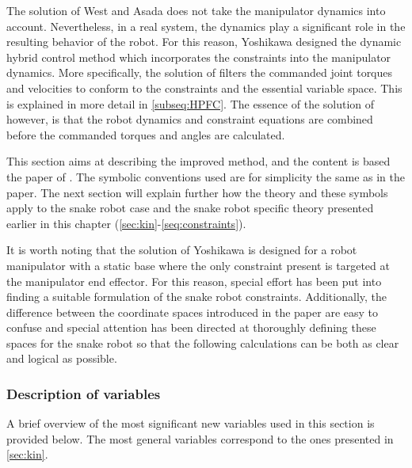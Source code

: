 The solution of West and Asada \cite{west1985method} does not take the manipulator dynamics into account. Nevertheless, in a real system, the dynamics play a significant role in the resulting behavior of the robot. For this reason, Yoshikawa \cite{yoshikawa1987dynamic} designed the dynamic hybrid control method which incorporates the constraints into the manipulator dynamics. More specifically, the solution of \cite{west1985method} filters the commanded joint torques and velocities to conform to the constraints and the essential variable space. This is explained in more detail in \ref{subseq:HPFC}. The essence of the solution of \cite{yoshikawa1987dynamic} however, is that the robot dynamics and constraint equations are combined before the commanded torques and angles are calculated. 

This section aims at describing the improved method, and the content is based the paper of \cite{yoshikawa1987dynamic}. The symbolic conventions used are for simplicity the same as in the paper. The next section will explain further how the theory and these symbols apply to the snake robot case and the snake robot specific theory presented earlier in this chapter (\ref{sec:kin}-\ref{seq:constraints}).

It is worth noting that the solution of Yoshikawa is designed for a robot manipulator with a static base where the only constraint present is targeted at the manipulator end effector. For this reason, special effort has been put into finding a suitable formulation of the snake robot constraints. Additionally, the difference between the coordinate spaces introduced in the paper are easy to confuse and special attention has been directed at thoroughly defining these spaces for the snake robot so that the following calculations can be both as clear and logical as possible.

\subsubsection{Description of variables}

A brief overview of the most significant new variables used in this section is provided below.
The most general variables correspond to the ones presented in \ref{sec:kin}.

